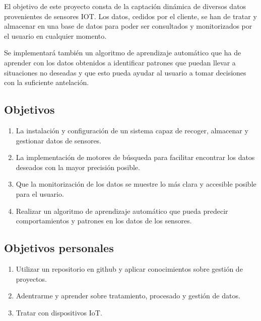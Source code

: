 
El objetivo de este proyecto consta de la captación dinámica de diversos datos provenientes de sensores IOT. Los datos, cedidos por el cliente, se han de tratar y almacenar en una base de datos para poder ser consultados y monitorizados por el usuario en cualquier momento. 

Se implementará también un algoritmo de aprendizaje automático que ha de aprender con los datos obtenidos a identificar patrones que puedan llevar a situaciones no deseadas y que esto pueda ayudar al usuario a tomar decisiones con la suficiente antelación.

\subsection{Objetivos}

\begin{enumerate}
    \item La instalación y configuración de un sistema capaz de recoger, almacenar y gestionar datos de sensores.
    \item La implementación de motores de búsqueda para facilitar encontrar los datos deseados con la mayor precisión posible.
    \item Que la monitorización de los datos se muestre lo más clara y accesible posible para el usuario.
    \item Realizar un algoritmo de aprendizaje automático que pueda predecir comportamientos y patrones en los datos de los sensores.
\end{enumerate}


\subsection{Objetivos personales}

\begin{enumerate}
    \item Utilizar un repositorio en github y aplicar conocimientos sobre gestión de proyectos.
    \item Adentrarme y aprender sobre tratamiento, procesado y gestión de datos.
    \item Tratar con dispositivos IoT.
\end{enumerate}

